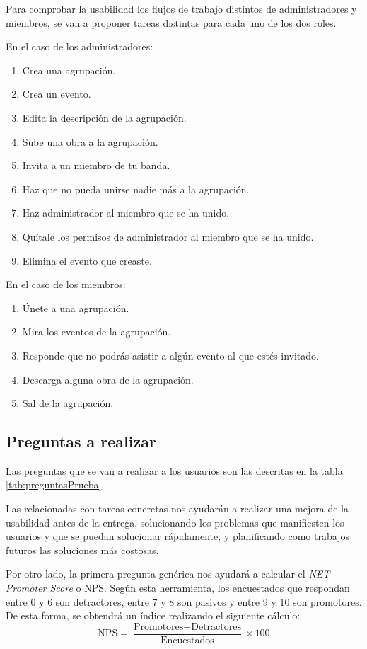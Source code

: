 Para comprobar la usabilidad los flujos de trabajo distintos de administradores y miembros, se van a proponer tareas distintas para cada uno de los dos roles.

En el caso de los administradores:

\begin{enumerate}
    \item Crea una agrupación.
    \item Crea un evento.
    \item Edita la descripción de la agrupación.
    \item Sube una obra a la agrupación.
    \item Invita a un miembro de tu banda.
    \item Haz que no pueda unirse nadie más a la agrupación.
    \item Haz administrador al miembro que se ha unido.
    \item Quítale los permisos de administrador al miembro que se ha unido.
    \item Elimina el evento que creaste.
\end{enumerate}

En el caso de los miembros:

\begin{enumerate}
    \item Únete a una agrupación.
    \item Mira los eventos de la agrupación.
    \item Responde que no podrás asistir a algún evento al que estés invitado.
    \item Descarga alguna obra de la agrupación.
    \item Sal de la agrupación.
\end{enumerate}


\subsection{Preguntas a realizar}

Las preguntas que se van a realizar a los usuarios son las descritas en la tabla \ref{tab:preguntasPrueba}.

Las relacionadas con tareas concretas nos ayudarán a realizar una mejora de la usabilidad antes de la entrega, solucionando los problemas que manifiesten los usuarios y que se puedan solucionar rápidamente, y planificando como trabajos futuros las soluciones más costosas.

Por otro lado, la primera pregunta genérica nos ayudará a calcular el \textit{NET Promoter Score} o NPS. Según esta herramienta, los encuestados que respondan entre 0 y 6 son detractores, entre 7 y 8 son pasivos y entre 9 y 10 son promotores\cite{SAURO201639}. De esta forma, se obtendrá un índice realizando el siguiente cálculo:
\[
\textrm{NPS} = \frac{\textrm{Promotores} - \textrm{Detractores}}{\textrm{Encuestados}} \times 100
\]

